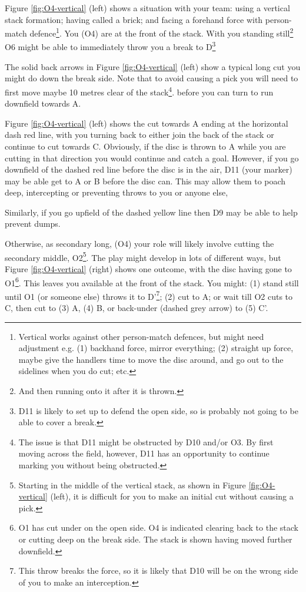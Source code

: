 \documentclass{tufte-handout}
\begin{document}
Figure \ref{fig:O4-vertical} (left) shows 
a situation 
with 
your team: 
using 
a vertical stack formation; 
having called a brick; and
facing a 
forehand force with 
person-match defence\footnote{
Vertical works
against other person-match defences, 
but might need 
adjustment e.g. 
(1) backhand force,
mirror everything;
(2) straight up force, 
maybe give the handlers 
time to move the disc around, 
and go out to the sidelines
when you do cut; etc.}. 
You (O4) 
are at the front 
of the stack.
With you 
standing still\footnote{
And then running onto it after it is thrown.} 
O6 might be able 
to immediately 
throw you
a break
to D\footnote{D11 
is likely to set up 
to defend the open side, 
so is probably 
not going to 
be able to cover a break.}

The solid back arrows 
in Figure \ref{fig:O4-vertical} (left) 
show
a typical 
long cut you might do 
down the break side. 
Note that 
to avoid 
causing a pick 
you will need to 
first move 
maybe 10 metres 
clear of the stack\footnote{
The issue is that D11 
might be obstructed 
by D10
and/or O3.  
By first moving across 
the field, 
however, 
D11 has an opportunity
to continue marking you 
without being obstructed.}. 
before you can turn
to run downfield
towards A.

Figure \ref{fig:O4-vertical} (left) 
shows the 
cut towards A 
ending at the 
horizontal 
dash red line, 
with you turning 
back to either 
join the back of the stack 
or continue 
to cut towards C. 
Obviously, 
if the disc is 
thrown to A 
while you are cutting 
in that direction 
you would continue 
and catch a goal.  
However, 
if you go 
downfield of the dashed red line 
before the disc is in the air,
D11 (your marker) 
may be able 
get to
A or B 
before the disc can. 
This may allow them 
to poach deep, 
intercepting 
or preventing 
throws to you 
or anyone else, 

Similarly, 
if you go 
upfield of the dashed yellow line
then D9 may 
be able to help
prevent dumps.




Otherwise, 
as secondary long, 
(O4) 
your role 
will likely 
involve cutting 
the secondary middle, O2\footnote{
Starting
in the middle of the vertical stack,
as shown in 
Figure \ref{fig:O4-vertical} (left),
it is difficult for 
you to make 
an initial cut 
without causing 
a pick.}.
The play might develop 
in lots of different ways, 
but
Figure \ref{fig:O4-vertical} (right) shows 
one outcome, 
with the disc 
having gone 
to O1\footnote{
O1 has cut under 
on the open side.
O4 is indicated 
clearing 
back to the stack 
or cutting 
deep on 
the break side. 
The stack is shown having 
moved further downfield.}. 
This leaves 
you 
available 
at the front of the stack. 
You might: 
(1) stand still until O1
(or someone else)  
throws it 
to D'\footnote{
This throw 
breaks the force, 
so it is likely 
that D10 will 
be on the wrong side 
of you to make an interception.};
(2) cut to A;
or wait till O2 
cuts to C, 
then cut to (3) A,
(4) B, or 
back-under 
(dashed grey arrow) 
to (5) C'.  
\end{document}
